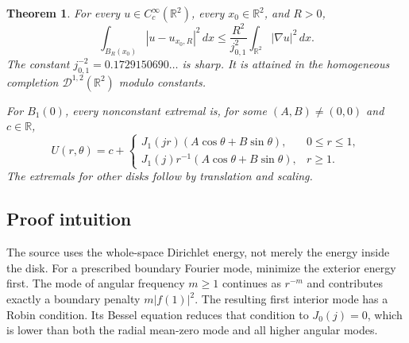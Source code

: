 \documentclass[11pt]{article}
\newtheorem{theorem}{Theorem}
\begin{document}
\begin{theorem}\label{thm:disk}
For every $u\in C_c^\infty(\mathbb R^2)$, every $x_0\in\mathbb R^2$, and
$R>0$,
\begin{equation}\label{eq:sharp}
 \int_{B_R(x_0)}|u-u_{x_0,R}|^2\,dx
 \le \frac{R^2}{j_{0,1}^2}\int_{\mathbb R^2}|\nabla u|^2\,dx.
\end{equation}
The constant $j_{0,1}^{-2}=0.1729150690\ldots$ is sharp.  It is attained in
the homogeneous completion $\mathcal D^{1,2}(\mathbb R^2)$ modulo constants.

For $B_1(0)$, every nonconstant extremal is, for some $(A,B)\ne(0,0)$ and
$c\in\mathbb R$,
\begin{equation}\label{eq:extremal}
U(r,\theta)=c+
\begin{cases}
J_1(jr)(A\cos\theta+B\sin\theta),&0\le r\le1,\\
J_1(j)r^{-1}(A\cos\theta+B\sin\theta),&r\ge1.
\end{cases}
\end{equation}
The extremals for other disks follow by translation and scaling.
\end{theorem}

\subsection*{Proof intuition}

The source uses the whole-space Dirichlet energy, not merely the energy inside
the disk.  For a prescribed boundary Fourier mode, minimize the exterior
energy first.  The mode of angular frequency $m\ge1$ continues as $r^{-m}$
and contributes exactly a boundary penalty $m|f(1)|^2$.  The resulting first
interior mode has a Robin condition.  Its Bessel equation reduces that
condition to $J_0(j)=0$, which is lower than both the radial mean-zero mode and
all higher angular modes.
\end{document}
